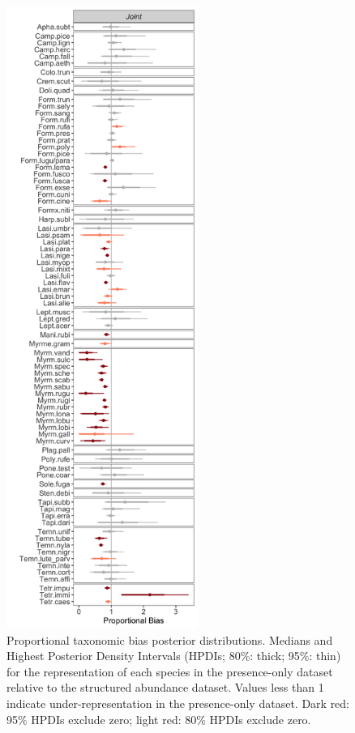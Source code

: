 \documentclass[preprint,review,times,12pt,3p]{elsarticle}
\begin{document}
\begin{figure}
	\centering\includegraphics[height=8in]{../../../ms/1_Ecography/1/figs/D.png}
	\caption{\label{fig:D} Proportional taxonomic bias posterior distributions. Medians and Highest Posterior Density Intervals (HPDIs; 80\%: thick; 95\%: thin) for the representation of each species in the presence-only dataset relative to the structured abundance dataset. Values less than 1 indicate under-representation in the presence-only dataset. Dark red: 95\% HPDIs exclude zero; light red: 80\% HPDIs exclude zero. }
\end{figure}
\end{document}
